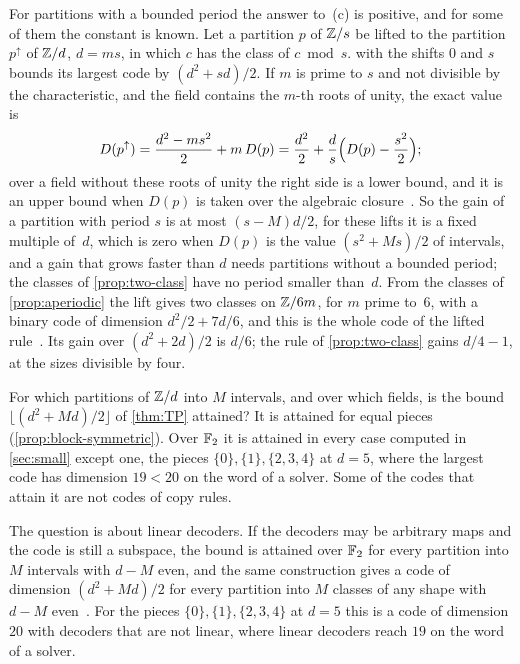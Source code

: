 For partitions with a bounded period the answer to~(c) is positive, and for some of them the constant is known. Let a
partition $p$ of $\mathbb{Z}/s$ be lifted to the partition $p^\uparrow$ of $\mathbb{Z}/d$, $d=ms$, in which $c$ has the class of
$c\bmod s$.  with the shifts $0$ and $s$ bounds its largest code by $(d^2+sd)/2$. If $m$ is prime to $s$
and not divisible by the characteristic, and the field contains the $m$-th roots of unity, the exact value is
\[
  D(p^\uparrow)=\frac{d^2-ms^2}2+m\,D(p)=\frac{d^2}2+\frac ds\Bigl(D(p)-\frac{s^2}2\Bigr);
\]
over a field without these roots of unity the right side is a lower bound, and it is an upper bound when $D(p)$ is
taken over the algebraic closure~\cite[Theorems~5.1 and~5.3]{SharedDecoders2026}. So the gain of a partition with
period $s$ is at most $(s-M)d/2$, for these lifts it is a fixed multiple of~$d$, which is zero when $D(p)$ is the
value $(s^2+Ms)/2$ of intervals, and a gain that grows faster than $d$ needs partitions without a bounded period; the
classes of \cref{prop:two-class} have no period smaller than~$d$. From the classes of \cref{prop:aperiodic} the lift
gives two classes on $\mathbb{Z}/6m$, for $m$ prime to~$6$, with a binary code of dimension $d^2/2+7d/6$, and this is the
whole code of the lifted rule~\cite[Corollary~5.2 and Theorem~B.2]{SharedDecoders2026}. Its gain over $(d^2+2d)/2$
is $d/6$; the rule of \cref{prop:two-class} gains $d/4-1$, at the sizes divisible by four.

\begin{problem}\label{prob:unequal}
For which partitions of $\mathbb{Z}/d$ into $M$ intervals, and over which fields, is the bound $\lfloor(d^2+Md)/2\rfloor$ of
\cref{thm:TP} attained? It is attained for equal pieces (\cref{prop:block-symmetric}). Over $\mathbb{F}_2$ it is attained in
every case computed in \cref{sec:small} except one, the pieces $\{0\},\{1\},\{2,3,4\}$ at $d=5$, where the largest code
has dimension $19<20$ on the word of a solver. Some of the codes that attain it are not codes of copy rules.
\end{problem}

The question is about linear decoders. If the decoders may be arbitrary maps and the code is still a subspace, the
bound is attained over $\mathbb{F}_2$ for every partition into $M$ intervals with $d-M$ even, and the same construction gives
a code of dimension $(d^2+Md)/2$ for every partition into $M$ classes of any shape with $d-M$
even~\cite[Theorem~4.3]{SharedDecoders2026}. For the pieces $\{0\},\{1\},\{2,3,4\}$ at $d=5$ this is a code of
dimension $20$ with decoders that are not linear, where linear decoders reach $19$ on the word of a solver.


